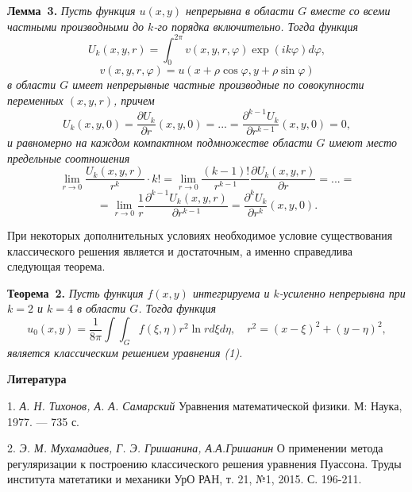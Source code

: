 \textbf{Лемма~3.}
{\it Пусть функция $u(x,y)$ непрерывна в области $G$ вместе со
всеми частными производными до $k$-го порядка включительно.
Тогда функция
$$
U_{k}(x,y,r)=\int_{0}^{2\pi}v(x,y,r,\varphi)\exp(ik\varphi) d\varphi,
$$
$$
 v(x,y,r,\varphi)=u(x+\rho \cos \varphi,y+\rho \sin \varphi)
$$
в области $G$ имеет непрерывные частные производные по
совокупности переменных $(x,y,r)$, причем
$$
U_{k}(x,y,0)=\frac{\partial U_{k}}{\partial r}(x,y,0)=
...=\frac{\partial^{k-1} U_{k}}{\partial r^{k-1}}(x,y,0)=0,
$$
и равномерно на каждом компактном подмножестве
области $G$ имеют место предельные соотношения
$$
\lim_{r\to 0}\frac{U_{k}(x,y,r)}{r^{k}}\cdot k!=
\lim_{r\to 0}\frac{(k-1)!}{r^{k-1}}\frac{\partial U_{k}(x,y,r)}{\partial r}=...=
$$
$$
=\lim_{r\to 0}\frac{1}{r}\frac{\partial^{k-1} U_{k}(x,y,r)}{\partial r^{k-1}}=
\frac{\partial^{k} U_{k}}{\partial r^{k}}(x,y,0).
$$
}

При некоторых дополнительных условиях необходимое условие
существования классического решения является и достаточным,
а именно справедлива следующая теорема.

\textbf{Теорема~2.}
  {\it Пусть функция $f(x,y)$ интегрируема и $k$-усиленно непрерывна
при $k=2$ и $k=4$ в области $G$. Тогда функция
$$
u_{0}(x,y)=\frac{1}{8\pi}\int\int_{G}f(\xi,\eta)r^{2}\ln r d\xi d\eta,\quad
r^{2}=(x-\xi)^{2}+(y-\eta)^{2},
$$
является классическим решением уравнения (1).}


\smallskip \centerline{\bf Литература}\nopagebreak

1. {\it А. Н. Тихонов, А. А. Самарский } Уравнения математической физики. М: Наука, 1977. — 735 с.

2. {\it Э. М. Мухамадиев, Г. Э. Гришанина, А.А.Гришанин} О применении метода регуляризации к построению классического решения уравнения Пуассона. Труды института матетатики и механики УрО РАН, т. 21, №1, 2015. С. 196-211.
